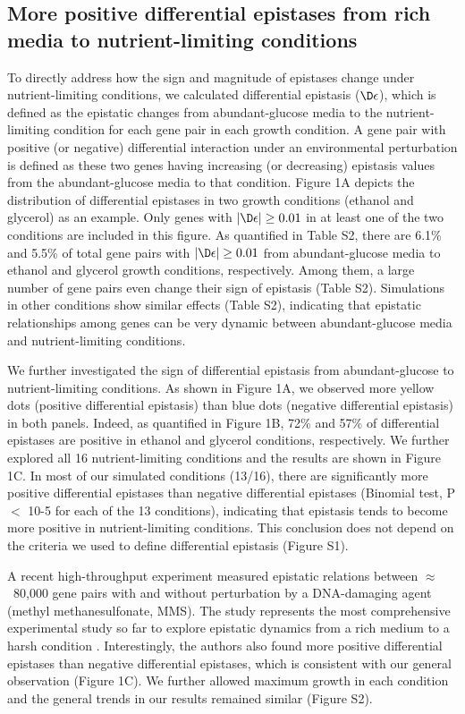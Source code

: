 \subsection{More positive differential epistases from rich media to
nutrient-limiting conditions}

To directly address how the sign and magnitude of epistases change
under nutrient-limiting conditions, we calculated differential
epistasis ($\D\epsilon$), which is defined as the epistatic changes from
abundant-glucose media to the nutrient-limiting condition for each
gene pair in each growth condition. A gene pair with positive (or
negative) differential interaction under an environmental perturbation
is defined as these two genes having increasing (or decreasing)
epistasis values from the abundant-glucose media to that
condition. Figure 1A depicts the distribution of differential
epistases in two growth conditions (ethanol and glycerol) as an
example. Only genes with $\left|\D\epsilon\right| \geq 0.01$ in at least
one of the two conditions are included in this figure. As quantified
in Table S2, there are 6.1\% and 5.5\% of total gene pairs with
$\left|\D\epsilon\right| \geq 0.01$ from abundant-glucose media to ethanol
and glycerol growth conditions, respectively. Among them, a large
number of gene pairs even change their sign of epistasis (Table
S2). Simulations in other conditions show similar effects (Table S2),
indicating that epistatic relationships among genes can be very
dynamic between abundant-glucose media and nutrient-limiting
conditions.

We further investigated the sign of differential epistasis from
abundant-glucose to nutrient-limiting conditions. As shown in Figure
1A, we observed more yellow dots (positive differential epistasis)
than blue dots (negative differential epistasis) in both
panels. Indeed, as quantified in Figure 1B, 72\% and 57\% of
differential epistases are positive in ethanol and glycerol
conditions, respectively. We further explored all 16 nutrient-limiting
conditions and the results are shown in Figure 1C. In most of our
simulated conditions (13/16), there are significantly more positive
differential epistases than negative differential epistases (Binomial
test, P $<$ 10-5 for each of the 13 conditions), indicating that
epistasis tends to become more positive in nutrient-limiting
conditions. This conclusion does not depend on the criteria we used to
define differential epistasis (Figure S1).

A recent high-throughput experiment measured epistatic relations
between $\approx$~80,000 gene pairs with and without perturbation by a
DNA-damaging agent (methyl methanesulfonate, MMS). The study
represents the most comprehensive experimental study so far to explore
epistatic dynamics from a rich medium to a harsh condition
\citep{Bandyopadhyay2011}. Interestingly, the authors also found more
positive differential
epistases than negative differential epistases, which is consistent
with our general observation (Figure 1C). We further allowed maximum
growth in each condition and the general trends in our results
remained similar (Figure S2).

